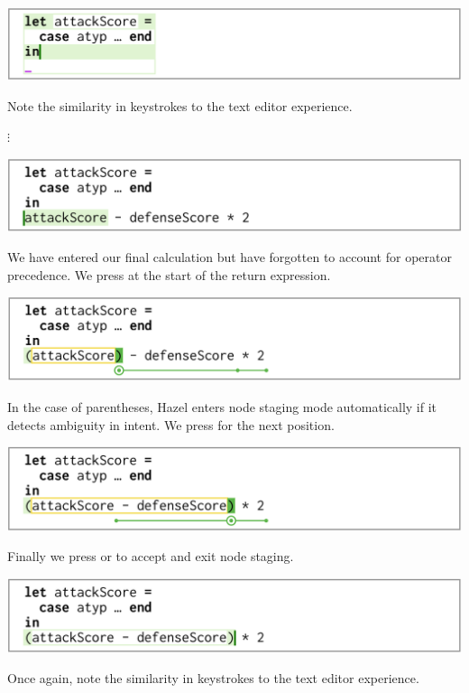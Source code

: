 \documentclass[format=sigplan,dvipsnames,backend=bibtex]{acmart}
\newcommand{\Hazel}{\textsf{Hazel}\xspace}
\newcommand{\key}[1]{\fbox{\texttt{#1}}}
\begin{document}
{\centering
  \includegraphics[width=\linewidth]{fig/frame9.png}\par
}
\noindent
Note the similarity in keystrokes to the text editor experience.

{\centering
	\vspace{-0.1cm}
  $\vdots$\par
  \vspace{0.1cm}
}
\noindent

{\centering
  \includegraphics[width=\linewidth]{fig/frame10.png}\par
}
\noindent
We have entered our final calculation but have forgotten to account for operator precedence.
We press \key{(} at the start of the return expression.

{\centering
  \includegraphics[width=\linewidth]{fig/frame11.png}\par
}
\noindent
In the case of parentheses, \Hazel enters node staging mode automatically if it detects
	ambiguity in intent.
We press \key{$\rightarrow$} for the next position.

{\centering
  \includegraphics[width=\linewidth]{fig/frame12.png}\par
}
\noindent
Finally we press \key{Enter} or \key{)} to accept and exit node staging. 

{\centering
  \includegraphics[width=\linewidth]{fig/frame13.png}\par
}
\noindent
Once again,
note the similarity in keystrokes to the text editor experience.

\newpage

\end{document}
